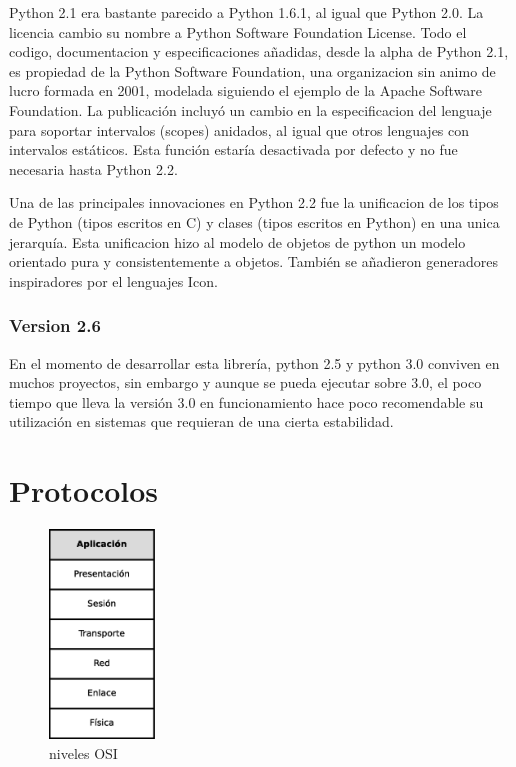\documentclass[a4paper,spanish,12pt]{book}
\begin{document}
Python 2.1 era bastante parecido a Python 1.6.1, al igual que Python 2.0. La licencia cambio su nombre a Python Software Foundation License. Todo el codigo, documentacion y especificaciones añadidas, desde la alpha de Python 2.1, es propiedad de la Python Software Foundation, una organizacion sin animo de lucro formada en 2001, modelada siguiendo el ejemplo de la Apache Software Foundation. La publicación incluyó un cambio en la especificacion del lenguaje para soportar intervalos (scopes) anidados, al igual que otros lenguajes con intervalos estáticos. Esta función estaría desactivada por defecto y no fue necesaria hasta Python 2.2.

Una de las principales innovaciones en Python 2.2 fue la unificacion de los tipos de Python (tipos escritos en C) y clases (tipos escritos en Python) en una unica jerarquía. Esta unificacion hizo al modelo de objetos de python un modelo orientado pura y consistentemente a objetos. Tambi\'en se añadieron generadores inspiradores por el lenguajes Icon.

\subsubsection{Version 2.6}

En el momento de desarrollar esta librería, python 2.5 y python 3.0 conviven en muchos proyectos, sin embargo y aunque se pueda ejecutar sobre 3.0, el poco tiempo que lleva la versión 3.0 en funcionamiento hace poco recomendable su utilización en sistemas que requieran de una cierta estabilidad.


\section{Protocolos}

\begin{figure}
	\includegraphics[width=0.25\textwidth]{img/NivelesOSI.eps}
              \caption{niveles OSI}
  \label{fig:nivelesOSI}
\end{figure}
\end{document}
